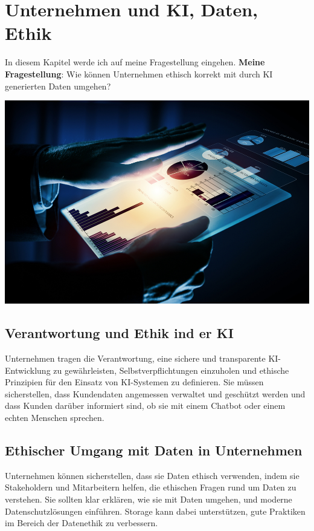 \chapter{Unternehmen und KI, Daten, Ethik}
\label{chap:methode}

In diesem Kapitel werde ich auf meine Fragestellung eingehen.
\newline
\textbf{Meine Fragestellung}:
\newline
Wie können Unternehmen ethisch korrekt mit durch KI generierten Daten umgehen?

\vspace{4mm}

\includegraphics[width=1.0\textwidth]{Verantwortung.jpeg}

\newpage

\section{Verantwortung und Ethik ind er KI}
Unternehmen tragen die Verantwortung, eine sichere und transparente KI-Entwicklung zu gewährleisten, Selbstverpflichtungen einzuholen und ethische Prinzipien für den Einsatz von KI-Systemen zu definieren. Sie müssen sicherstellen, dass Kundendaten angemessen verwaltet und geschützt werden und dass Kunden darüber informiert sind, ob sie mit einem Chatbot oder einem echten Menschen sprechen.

\section{Ethischer Umgang mit Daten in Unternehmen}

Unternehmen können sicherstellen, dass sie Daten ethisch verwenden, indem sie Stakeholdern und Mitarbeitern helfen, die ethischen Fragen rund um Daten zu verstehen. Sie sollten klar erklären, wie sie mit Daten umgehen, und moderne Datenschutzlösungen einführen. Storage kann dabei unterstützen, gute Praktiken im Bereich der Datenethik zu verbessern.

